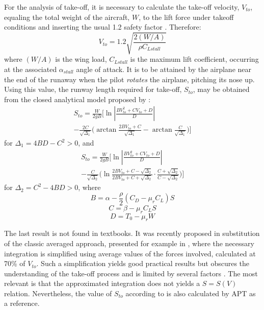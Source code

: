 \documentclass[10pt]{SelfArx} %
\begin{document}
For the analysis of take-off, it is necessary to  calculate  the take-off velocity, $V_ {to}$, equaling the total weight of the aircraft, $W$, to the lift force under takeoff conditions and inserting the usual 1.2 safety factor \cite{far}. Therefore:
\begin{equation}  \label{eq:Vlo}
V_{to}=1.2\sqrt{\frac{2(W/A)}{ \rho C_{Lstall}}}
\end{equation}
where $(W / A)$ is the wing load, $C_{Lstall}$ is the maximum lift coefficient, occurring at the associated $\alpha_{stall}$ angle of attack. It is to be attained by the airplane near the end of the runaway when the pilot \emph{rotates} the airplane, pitching its nose up. Using this value, the runway length required for take-off, $S_{to}$, may be obtained  from the closed analytical model proposed by \cite{pellegrini_rodrigues}:
\begin{multline} \label{eq:decola1}
S_{to}  =  \frac{W }{ 2gB} \Bigg[ \ln \left| \frac{BV_{to}^2 + CV_{to} + D }{ D} \right| \\
- \frac{2C }{ \sqrt{\Delta_1}}\bigg(\! \arctan\frac{2BV_{to}+C}{\sqrt{\Delta_1}} - \arctan\frac{C }{ \sqrt{\Delta_1}} \bigg) \Bigg]
\end{multline}
for ${\Delta_1=4BD-C^2}>0$, and 
\bigskip\bigskip\bigskip
\begin{multline} \label{eq:decola2}
S_{to}  =  \frac{W }{ 2gB} \Bigg[ \ln \left| \frac{BV_{{to}}^2 + CV_{to} + D }{ D} \right| \\
 - \frac{C }{ \sqrt{\Delta_2}}
 \bigg(\!\ln\frac{2BV_{to}+C - \!\sqrt{\Delta_2}}{2BV_{to}+C + \!\sqrt{\Delta_2}} 
 \cdot\frac{C + \!\sqrt{\Delta_2}}{C - \!\sqrt{\Delta_2}}  \bigg)\Bigg]
\end{multline}
for ${\Delta_2 = C^2-4BD}>0$, where 
\begin{equation} \label{eq:A}
B = \alpha - \frac{\rho}{2} (C_{D} - \mu_r C_L) S 
\end{equation}
\begin{equation} \label{eq:B}
C = \beta  - \mu_r C_L S 
\end{equation}
\begin{equation} \label{eq:C}
D = T_0 -\mu_rW 
\end{equation}

The last result is not found in textbooks. It was recently proposed in substitution of the classic averaged approach, presented for example in \cite{anderson}, where the necessary integration is simplified using average values of the forces involved, calculated at 70\% of $V_{to}$. Such a simplification yields good practical results but obscures the understanding of the take-off process and is limited by several factors \cite{perkins}. The most relevant is that the approximated integration does not yields a $S=S(V)$ relation. Nevertheless, the value of $S_{to}$ according to \cite{anderson} is also calculated by APT as a reference.
\end{document}
